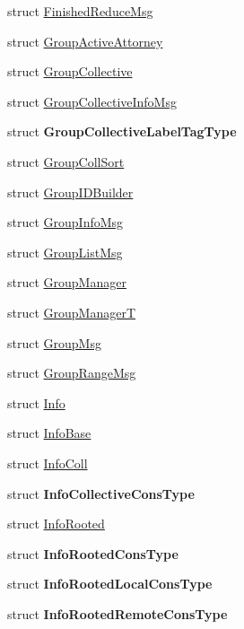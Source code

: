\begin{DoxyCompactItemize}
\item 
struct \hyperlink{structvt_1_1group_1_1_finished_reduce_msg}{Finished\+Reduce\+Msg}
\item 
struct \hyperlink{structvt_1_1group_1_1_group_active_attorney}{Group\+Active\+Attorney}
\item 
struct \hyperlink{structvt_1_1group_1_1_group_collective}{Group\+Collective}
\item 
struct \hyperlink{structvt_1_1group_1_1_group_collective_info_msg}{Group\+Collective\+Info\+Msg}
\item 
struct {\bfseries Group\+Collective\+Label\+Tag\+Type}
\item 
struct \hyperlink{structvt_1_1group_1_1_group_coll_sort}{Group\+Coll\+Sort}
\item 
struct \hyperlink{structvt_1_1group_1_1_group_i_d_builder}{Group\+I\+D\+Builder}
\item 
struct \hyperlink{structvt_1_1group_1_1_group_info_msg}{Group\+Info\+Msg}
\item 
struct \hyperlink{structvt_1_1group_1_1_group_list_msg}{Group\+List\+Msg}
\item 
struct \hyperlink{structvt_1_1group_1_1_group_manager}{Group\+Manager}
\item 
struct \hyperlink{structvt_1_1group_1_1_group_manager_t}{Group\+ManagerT}
\item 
struct \hyperlink{structvt_1_1group_1_1_group_msg}{Group\+Msg}
\item 
struct \hyperlink{structvt_1_1group_1_1_group_range_msg}{Group\+Range\+Msg}
\item 
struct \hyperlink{structvt_1_1group_1_1_info}{Info}
\item 
struct \hyperlink{structvt_1_1group_1_1_info_base}{Info\+Base}
\item 
struct \hyperlink{structvt_1_1group_1_1_info_coll}{Info\+Coll}
\item 
struct {\bfseries Info\+Collective\+Cons\+Type}
\item 
struct \hyperlink{structvt_1_1group_1_1_info_rooted}{Info\+Rooted}
\item 
struct {\bfseries Info\+Rooted\+Cons\+Type}
\item 
struct {\bfseries Info\+Rooted\+Local\+Cons\+Type}
\item 
struct {\bfseries Info\+Rooted\+Remote\+Cons\+Type}
\end{DoxyCompactItemize}
